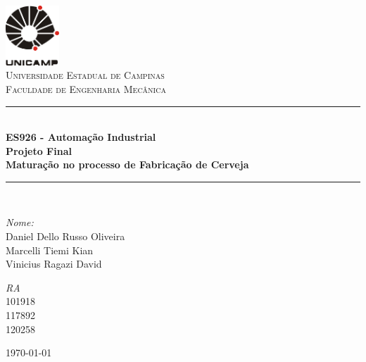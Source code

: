 
\begin{titlepage}
\begin{center}	

\newcommand{\HRule}{\rule{\linewidth}{0.5mm}}
\includegraphics[width=0.15\textwidth]{logoUnicamp}~\\[1cm]

\textsc{\LARGE Universidade Estadual de Campinas}\\[1.5cm]

\textsc{\Large Faculdade de Engenharia Mecânica}\\[0.5cm]

\HRule \\[0.4cm]
{ \Large \bfseries{ES926 - Automação Industrial\\ \vspace{0.8cm} Projeto Final}\\
\large{Maturação no processo de Fabricação de Cerveja}\\[0.4cm] }

\HRule \\[1.5cm]

\begin{minipage}{0.6\textwidth}
\begin{flushleft} \large
\emph{Nome:}\\
Daniel Dello Russo Oliveira\\ Marcelli Tiemi Kian\\ Vinicius Ragazi David
\end{flushleft}
\end{minipage}
\begin{minipage}{0.2\textwidth}
\begin{flushright} \large
\emph{RA}\\ 101918\\
117892\\ 120258
\end{flushright}
\end{minipage}

\vfill

{\large \today}

\end{center}
\end{titlepage}
